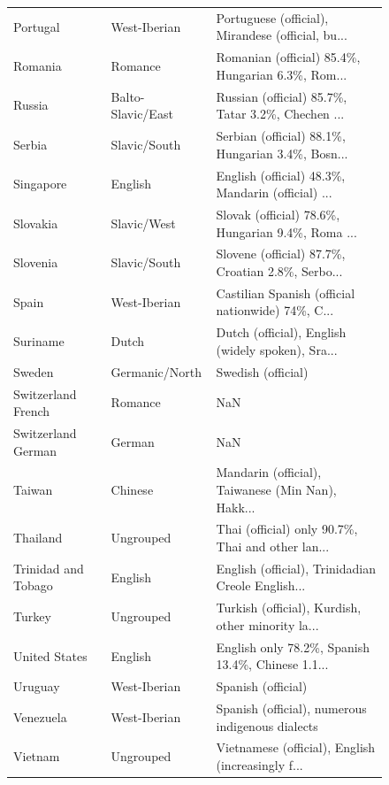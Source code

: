 \documentclass[a4paper,10pt]{article}
\begin{document}
\begin{figure}
\begin{center}
\begin{tabularx}{\textwidth}{llX}
Portugal            &       West-Iberian &  Portuguese (official), Mirandese (official, bu... \\
Romania             &            Romance &  Romanian (official) 85.4\%, Hungarian 6.3\%, Rom... \\
Russia              &  Balto-Slavic/East &  Russian (official) 85.7\%, Tatar 3.2\%, Chechen ... \\
Serbia              &       Slavic/South &  Serbian (official) 88.1\%, Hungarian 3.4\%, Bosn... \\
Singapore           &            English &  English (official) 48.3\%, Mandarin (official) ... \\
Slovakia            &        Slavic/West &  Slovak (official) 78.6\%, Hungarian 9.4\%, Roma ... \\
Slovenia            &       Slavic/South &  Slovene (official) 87.7\%, Croatian 2.8\%, Serbo... \\
Spain               &       West-Iberian &  Castilian Spanish (official nationwide) 74\%, C... \\
Suriname            &              Dutch &  Dutch (official), English (widely spoken), Sra... \\
Sweden              &     Germanic/North &                                 Swedish (official) \\
Switzerland French  &            Romance &                                                NaN \\
Switzerland German  &             German &                                                NaN \\
Taiwan              &            Chinese &  Mandarin (official), Taiwanese (Min Nan), Hakk... \\
Thailand            &          Ungrouped &  Thai (official) only 90.7\%, Thai and other lan... \\
Trinidad and Tobago &            English &  English (official), Trinidadian Creole English... \\
Turkey              &          Ungrouped &  Turkish (official), Kurdish, other minority la... \\
United States       &            English &  English only 78.2\%, Spanish 13.4\%, Chinese 1.1... \\
Uruguay             &       West-Iberian &                                 Spanish (official) \\
Venezuela           &       West-Iberian &   Spanish (official), numerous indigenous dialects \\
Vietnam             &          Ungrouped &  Vietnamese (official), English (increasingly f... \\
\bottomrule
\end{tabularx}
\end{center}
\label{langs2}
\end{figure}
\end{document}
